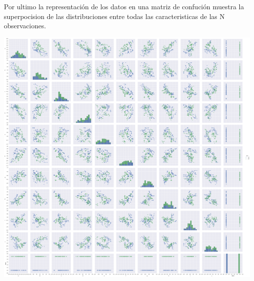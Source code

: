 \documentclass[fleqn,10pt]{SelfArx}
\begin{document}
Por ultimo la representación de los datos en una matriz de confución muestra la superpocision de las distribuciones entre todas las caracteristicas de las N observaciones.

\centering\includegraphics[scale=0.15]{fig/dataset.png} 
\end{document}
